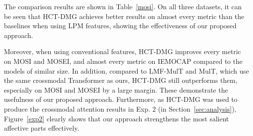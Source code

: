 \documentclass[11pt,a4paper]{article}
\begin{document}
\begin{table}[!ht]
\centering
{}
\end{table}

The comparison results are shown in Table~\ref{mosi}. On all three datasets, it can be seen that HCT-DMG achieves better results on almost every metric than the baselines when using LPM features, showing the effectiveness of our proposed approach. 

Moreover, when using conventional features, HCT-DMG improves every metric on MOSI and MOSEI, and almost every metric on IEMOCAP compared to the models of similar size. In addition, compared to LMF-MulT and MulT, which use the same crossmodal Transformer as ours, HCT-DMG still outperforms them, especially on MOSI and MOSEI by a large margin. These demonstrate the usefulness of our proposed approach. Furthermore, as HCT-DMG was used to produce the crossmodal attention results in Exp. 2 (in Section~\ref{sec:analysis}), Figure~\ref{exp2} clearly shows that our approach strengthens the most salient affective parts effectively.
\end{document}
